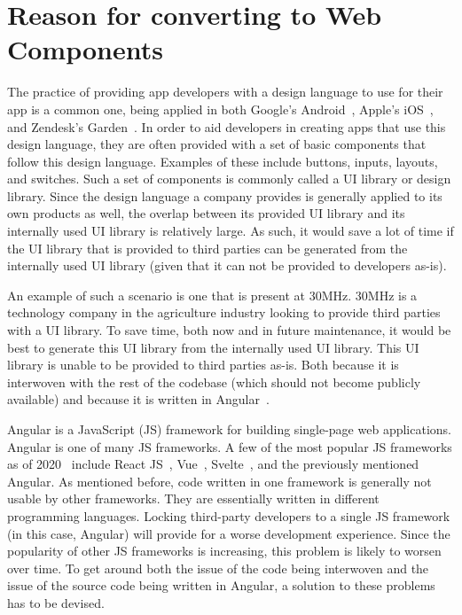 \section{Reason for converting to Web Components}
The practice of providing app developers with a design language to use for their app is a common one, being applied in both Google's Android~, Apple's iOS~, and Zendesk's Garden~. In order to aid developers in creating apps that use this design language, they are often provided with a set of basic components that follow this design language. Examples of these include buttons, inputs, layouts, and switches. Such a set of components is commonly called a UI library or design library. Since the design language a company provides is generally applied to its own products as well, the overlap between its provided UI library and its internally used UI library is relatively large. As such, it would save a lot of time if the UI library that is provided to third parties can be generated from the internally used UI library (given that it can not be provided to developers as-is).

An example of such a scenario is one that is present at 30MHz. 30MHz is a technology company in the agriculture industry looking to provide third parties with a UI library. To save time, both now and in future maintenance, it would be best to generate this UI library from the internally used UI library. This UI library is unable to be provided to third parties as-is. Both because it is interwoven with the rest of the codebase (which should not become publicly available) and because it is written in Angular~.

Angular is a JavaScript (JS) framework for building single-page web applications. Angular is one of many JS frameworks. A few of the most popular JS frameworks as of 2020~ include React JS~, Vue~, Svelte~, and the previously mentioned Angular. As mentioned before, code written in one framework is generally not usable by other frameworks. They are essentially written in different programming languages. Locking third-party developers to a single JS framework (in this case, Angular) will provide for a worse development experience. Since the popularity of other JS frameworks is increasing, this problem is likely to worsen over time. To get around both the issue of the code being interwoven and the issue of the source code being written in Angular, a solution to these problems has to be devised.

